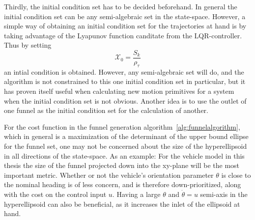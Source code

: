 Thirdly, the initial condition set has to be decided beforehand. In general the
initial condition set can be any semi-algebraic set in the state-space. However,
a simple way of obtaining an initial condition set for the trajectories at hand
is by taking advantage of the Lyapunov function canditate from the
\ac{LQR}-controller. Thus by setting
\begin{equation}
  \mathcal{X}_{0} = \frac{S_{k}}{\rho_{\tau}}
\end{equation}
an intial condition is obtained. However, any semi-algebraic set will do, and
the algorithm is not constrained to this one initial condition set in
particular, but it has proven itself useful when calculating new motion
primitives for a system when the initial condition set is not obvious. Another
idea is to use the outlet of one funnel as the initial condition set for the
calculation of another.

For the cost function in the funnel generation
algorithm~\ref{alg:funnelalgorithm}, which in general is a maximization of the
determinant of the upper bound ellipse for the funnel set, one may not be
concerned about the size of the hyperellipsoid in all directions of the
state-space. As an example: For the vehicle model in this thesis the size of the
funnel projected down into the xy-plane will be the most important metric.
Whether or not the vehicle's orientation parameter \(\theta\) is close to the
nominal heading is of less concern, and is therefore down-prioritized, along
with the cost on the control input \(u\). Having a large \(\theta\) and
\(\dot{\theta}=u\) semi-axis in the hyperellipsoid can also be beneficial, as it
increases the inlet of the ellipsoid at hand. 


